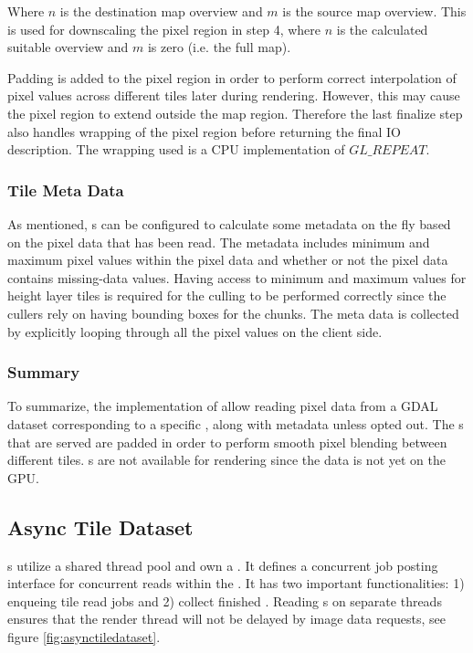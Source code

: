 Where $n$ is the destination map overview and $m$ is the source map overview. This is used for downscaling the pixel region in step 4, where $n$ is the calculated suitable overview and $m$ is zero (i.e. the full map). 

Padding is added to the pixel region in order to perform correct interpolation of pixel values across different tiles later during rendering. However, this may cause the pixel region to extend outside the map region. Therefore the last finalize step also handles wrapping of the pixel region before returning the final IO description. The wrapping used is a CPU implementation of $GL\_REPEAT$.

\subsubsection{Tile Meta Data}
As mentioned, s can be configured to calculate some metadata on the fly based on the pixel data that has been read. The metadata includes minimum and maximum pixel values within the pixel data and whether or not the pixel data contains missing-data values. Having access to minimum and maximum values for height layer tiles is required for the culling to be performed correctly since the cullers rely on having bounding boxes for the chunks. The meta data is collected by explicitly looping through all the pixel values on the client side. 

\subsubsection{Summary}
To summarize, the implementation of  allow reading pixel data from a GDAL dataset corresponding to a specific , along with metadata unless opted out. The s that are served are padded in order to perform smooth pixel blending between different tiles. s are not available for rendering since the data is not yet on the GPU.

\subsection{Async Tile Dataset}
s utilize a shared thread pool and own a . It defines a concurrent job posting interface for concurrent reads within the . It has two important functionalities: 1) enqueing tile read jobs and 2) collect finished . Reading s on separate threads ensures that the render thread will not be delayed by image data requests, see figure \ref{fig:asynctiledataset}.

